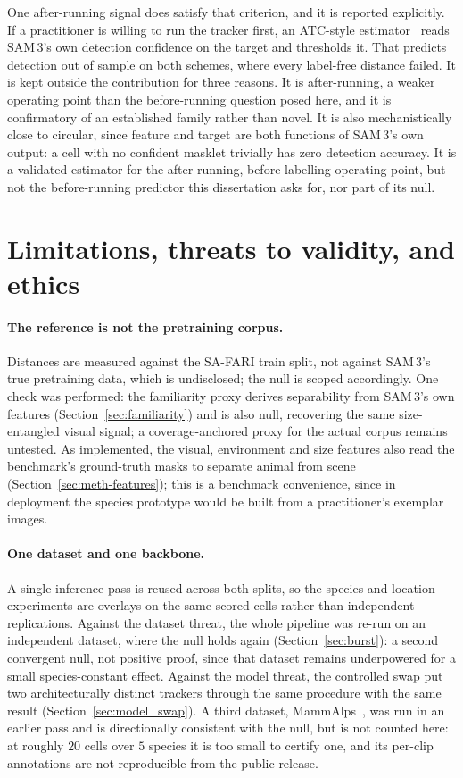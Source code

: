 One after-running signal does satisfy that criterion, and it is reported explicitly. If a practitioner is willing to run the tracker first, an ATC-style estimator~\cite{atc} reads
SAM\,3's own detection confidence on the target and thresholds it. That predicts detection out of sample on
both schemes, where every label-free distance failed. It is kept outside the contribution for
three reasons. It is after-running, a weaker operating point than the before-running question
posed here, and it is confirmatory of an established family rather than novel. It
is also mechanistically close to circular, since feature and target are both functions of SAM\,3's own
output: a cell with no confident masklet trivially has zero detection accuracy. It is a validated estimator
for the after-running, before-labelling operating point, but not the before-running predictor this
dissertation asks for, nor part of its null.

\section{Limitations, threats to validity, and ethics}
\label{sec:limitations}

\paragraph{The reference is not the pretraining corpus.} Distances are measured against the SA-FARI train
split, not against SAM\,3's true pretraining data, which is undisclosed; the null is scoped accordingly.
One check was performed: the familiarity proxy derives separability from SAM\,3's own features
(Section~\ref{sec:familiarity}) and is also null, recovering the same size-entangled visual signal; a
coverage-anchored proxy for the actual corpus remains untested. As implemented, the visual, environment and
size features also read the benchmark's ground-truth masks to separate animal from scene
(Section~\ref{sec:meth-features}); this is a benchmark convenience, since in deployment the species
prototype would be built from a practitioner's exemplar images.

\paragraph{One dataset and one backbone.} A single inference pass is reused across both splits, so the
species and location experiments are overlays on the same scored cells rather than independent replications. Against the dataset threat, the whole pipeline was re-run on an independent dataset, where the
null holds again (Section~\ref{sec:burst}): a second convergent null, not positive proof, since that dataset
remains underpowered for a small species-constant effect. Against the model threat, the controlled
swap put two architecturally distinct trackers through the same procedure with the same result
(Section~\ref{sec:model_swap}). A third dataset, MammAlps~\cite{mammalps}, was run in an earlier pass and
is directionally consistent with the null, but is not counted here: at roughly $20$ cells over $5$ species it
is too small to certify one, and its per-clip annotations are not reproducible from the public release.

